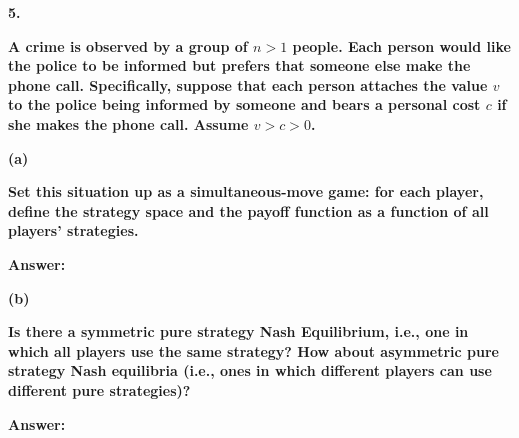 \documentclass[letterpaper,11pt]{article}
\begin{document}
\bigbreak

\begin{addmargin}[-2em]{0em} \large{\textbf{5. }}\end{addmargin}

\textbf{A crime is observed by a group of $n > 1$ people. Each person would like the police to be informed but prefers that someone else make the phone call. Specifically, suppose that each person attaches the value $v$ to the police being informed by someone and bears a personal cost $c$ if she makes the phone call. Assume $v > c > 0$.
}

\begin{addmargin}[-1.1em]{0em}
\textbf{(a)}\par\end{addmargin}
  \textbf{Set this situation up as a simultaneous-move game: for each player, define the strategy space and the payoff function as a function of all players’ strategies.
}\par
        \bigbreak
        \begin{addmargin}[-0.5em]{0em}
        \textbf{Answer: }\end{addmargin}



\begin{addmargin}[-1.1em]{0em}
\textbf{(b)}\par\end{addmargin}
        \textbf{Is there a symmetric pure strategy Nash Equilibrium, i.e., one in which all players use the same strategy? How about asymmetric pure strategy Nash equilibria (i.e., ones in which different players can use different pure strategies)?}\par
       \bigbreak
       \begin{addmargin}[-0.5em]{0em}
       \textbf{Answer: }\end{addmargin}
\end{document}
